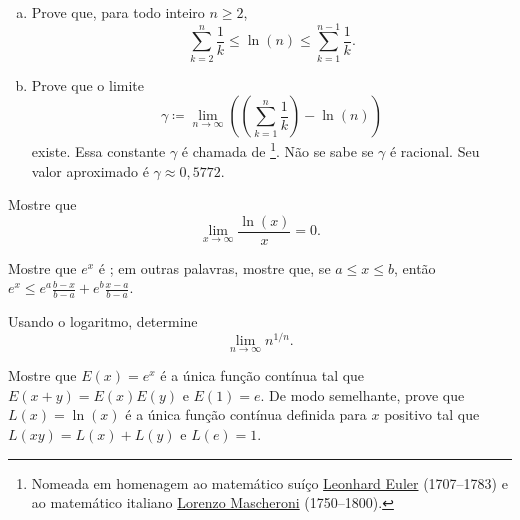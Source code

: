 \begin{samepage}
\begin{exercise}
\leavevmode
\begin{enumerate}[a)]
\item
Prove que, para todo inteiro $n \geq 2$,
\begin{equation*}
\sum_{k=2}^{n}
\frac{1}{k}
\leq
\ln (n)
\leq
\sum_{k=1}^{n-1}
\frac{1}{k} .
\end{equation*}
\item
Prove que o limite
\begin{equation*}
\gamma \coloneqq \lim_{n\to\infty}
\left( \left( \sum_{k=1}^{n} \frac{1}{k} \right) - \ln (n) \right)
\end{equation*}
existe. Essa constante $\gamma$ é chamada de
\emph{}%
\footnote{Nomeada em homenagem ao matemático suíço
\href{https://en.wikipedia.org/wiki/Leonhard_Euler}{Leonhard Euler}
(1707--1783)
e ao matemático italiano
\href{https://en.wikipedia.org/wiki/Lorenzo_Mascheroni}{Lorenzo Mascheroni}
(1750--1800).}. Não se sabe se $\gamma$ é racional.
Seu valor aproximado é $\gamma \approx 0{,}5772$.
\end{enumerate}
\end{exercise}
\end{samepage}

\begin{exercise}
Mostre que
\begin{equation*}
\lim_{x\to\infty} \frac{\ln(x)}{x} = 0 .
\end{equation*}
\end{exercise}

\begin{exercise}
Mostre que $e^x$ é \emph{}; em outras palavras, mostre que,
se $a \leq x \leq b$, então
$e^x \leq e^a \frac{b-x}{b-a} + e^b \frac{x-a}{b-a}$.
\end{exercise}

\begin{exercise}
Usando o logaritmo, determine
\begin{equation*}
\lim_{n\to\infty} n^{1/n} .
\end{equation*}
\end{exercise}

\begin{exercise}
Mostre que $E(x) = e^x$ é a única função contínua tal que
$E(x+y) = E(x)E(y)$ e $E(1) = e$. De modo semelhante, prove que
$L(x) = \ln(x)$ é a única função contínua definida para $x$ positivo tal que
$L(xy) = L(x)+L(y)$ e $L(e) = 1$.
\end{exercise}

